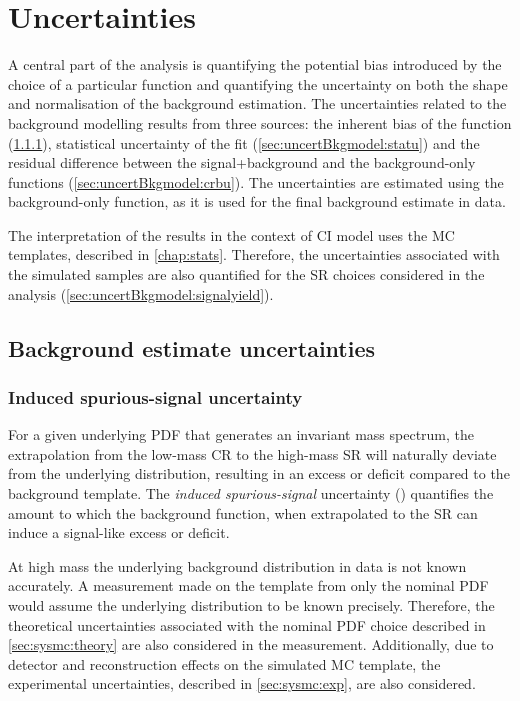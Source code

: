 \chapter{Uncertainties}\label{chap:uncertBkgmodel}
A central part of the analysis is quantifying the potential bias introduced by the choice of a particular function and quantifying the uncertainty on both the shape and normalisation of the background estimation. The uncertainties related to the background modelling results from three sources: the inherent bias of the function (\cref{sec:uncertBkgmodel:iss}), statistical uncertainty of the fit (\cref{sec:uncertBkgmodel:statu}) and the residual difference between the signal+background and the background-only functions (\cref{sec:uncertBkgmodel:crbu}). The uncertainties are estimated using the background-only function, as it is used for the final background estimate in data. 

The interpretation of the results in the context of CI model uses the MC templates, described in \cref{chap:stats}. Therefore, the uncertainties associated with the simulated samples are also quantified for the SR choices considered in the analysis (\cref{sec:uncertBkgmodel:signalyield}).
 
\section{Background estimate uncertainties}

\subsection{Induced spurious-signal uncertainty}\label{sec:uncertBkgmodel:iss}
For a given underlying PDF that generates an invariant mass spectrum, the extrapolation from the low-mass CR to the high-mass SR will naturally deviate from the underlying distribution, resulting in an excess or deficit compared to the background template. The \emph{induced spurious-signal} uncertainty (\ISSU) quantifies the amount to which the background function, when extrapolated to the SR can induce a signal-like excess or deficit. 

At high mass the underlying background distribution in data is not known accurately. A \ISSU measurement made on the template from only the nominal PDF would assume the underlying distribution to be known precisely. Therefore, the theoretical uncertainties associated with the nominal PDF choice described in \cref{sec:sysmc:theory} are also considered in the \ISSU measurement. Additionally, due to detector and reconstruction effects on the simulated MC template, the experimental uncertainties, described in \cref{sec:sysmc:exp}, are also considered. 

